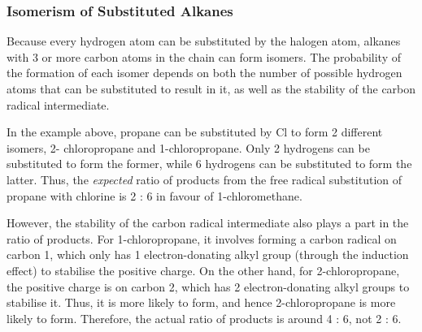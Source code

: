 			\subsubsection{Isomerism of Substituted Alkanes}

				Because every hydrogen atom can be substituted by the halogen atom, alkanes with 3 or more carbon atoms in the chain
				can form isomers. The probability of the formation of each isomer depends on both the number of possible hydrogen atoms
				that can be substituted to result in it, as well as the stability of the carbon radical intermediate.





				In the example above, propane can be substituted by Cl to form 2 different isomers, 2- chloropropane and 1-chloropropane.
				Only 2 hydrogens can be substituted to form the former, while 6 hydrogens can be substituted to form the latter. Thus, the
				\textit{expected} ratio of products from the free radical substitution of propane with chlorine is 2 : 6 in
				favour of 1-chloromethane.

				However, the stability of the carbon radical intermediate also plays a part in the ratio of products. For 1-chloropropane,
				it involves forming a carbon radical on carbon 1, which only has 1 electron-donating alkyl group (through the induction effect)
				to stabilise the positive charge. On the other hand, for 2-chloropropane, the positive charge is on carbon 2, which
				has 2 electron-donating alkyl groups to stabilise it. Thus, it is more likely to form, and hence 2-chloropropane is more
				likely to form.	Therefore, the actual ratio of products is around 4 : 6, not 2 : 6.

